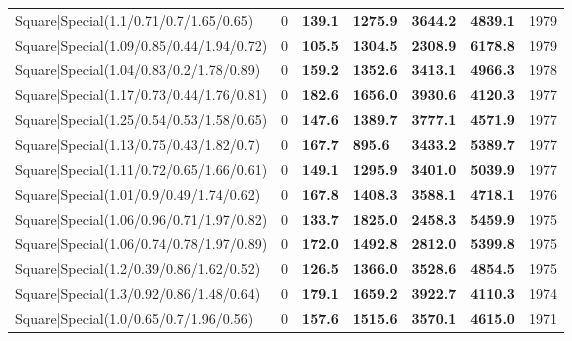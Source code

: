 \begin{tabular}{lrllllr}
 Square|Special(1.1/0.71/0.7/1.65/0.65)                        &             0   & \textbf{139.1} & \textbf{1275.9} & \textbf{3644.2} & \textbf{4839.1} &         1979 \\
 Square|Special(1.09/0.85/0.44/1.94/0.72)                      &             0   & \textbf{105.5} & \textbf{1304.5} & \textbf{2308.9} & \textbf{6178.8} &         1979 \\
 Square|Special(1.04/0.83/0.2/1.78/0.89)                       &             0   & \textbf{159.2} & \textbf{1352.6} & \textbf{3413.1} & \textbf{4966.3} &         1978 \\
 Square|Special(1.17/0.73/0.44/1.76/0.81)                      &             0   & \textbf{182.6} & \textbf{1656.0} & \textbf{3930.6} & \textbf{4120.3} &         1977 \\
 Square|Special(1.25/0.54/0.53/1.58/0.65)                      &             0   & \textbf{147.6} & \textbf{1389.7} & \textbf{3777.1} & \textbf{4571.9} &         1977 \\
 Square|Special(1.13/0.75/0.43/1.82/0.7)                       &             0   & \textbf{167.7} & \textbf{895.6}  & \textbf{3433.2} & \textbf{5389.7} &         1977 \\
 Square|Special(1.11/0.72/0.65/1.66/0.61)                      &             0   & \textbf{149.1} & \textbf{1295.9} & \textbf{3401.0} & \textbf{5039.9} &         1977 \\
 Square|Special(1.01/0.9/0.49/1.74/0.62)                       &             0   & \textbf{167.8} & \textbf{1408.3} & \textbf{3588.1} & \textbf{4718.1} &         1976 \\
 Square|Special(1.06/0.96/0.71/1.97/0.82)                      &             0   & \textbf{133.7} & \textbf{1825.0} & \textbf{2458.3} & \textbf{5459.9} &         1975 \\
 Square|Special(1.06/0.74/0.78/1.97/0.89)                      &             0   & \textbf{172.0} & \textbf{1492.8} & \textbf{2812.0} & \textbf{5399.8} &         1975 \\
 Square|Special(1.2/0.39/0.86/1.62/0.52)                       &             0   & \textbf{126.5} & \textbf{1366.0} & \textbf{3528.6} & \textbf{4854.5} &         1975 \\
 Square|Special(1.3/0.92/0.86/1.48/0.64)                       &             0   & \textbf{179.1} & \textbf{1659.2} & \textbf{3922.7} & \textbf{4110.3} &         1974 \\
 Square|Special(1.0/0.65/0.7/1.96/0.56)                        &             0   & \textbf{157.6} & \textbf{1515.6} & \textbf{3570.1} & \textbf{4615.0} &         1971 \\

\end{tabular}

